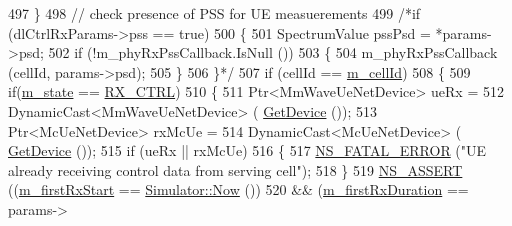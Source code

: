 \begin{DoxyCode}
497                         \}
498                         \textcolor{comment}{// check presence of PSS for UE measuerements}
499                         \textcolor{comment}{/*if (dlCtrlRxParams->pss == true)}
500 \textcolor{comment}{                        \{}
501 \textcolor{comment}{                                SpectrumValue pssPsd = *params->psd;}
502 \textcolor{comment}{                                if (!m\_phyRxPssCallback.IsNull ())}
503 \textcolor{comment}{                                \{}
504 \textcolor{comment}{                                        m\_phyRxPssCallback (cellId, params->psd);}
505 \textcolor{comment}{                                \}}
506 \textcolor{comment}{                        \}*/}
507                         \textcolor{keywordflow}{if} (cellId  == \hyperlink{classns3_1_1MmWaveSpectrumPhy_ac47302ef0f8154064d84adcc0001d77c}{m\_cellId})
508                         \{
509                                 \textcolor{keywordflow}{if}(\hyperlink{classns3_1_1MmWaveSpectrumPhy_ab6330aa9de7700e7e15b82000335665d}{m\_state} == \hyperlink{classns3_1_1MmWaveSpectrumPhy_a665335f60416cf031a9b68209e4368aea1f35c17b447eeb9d376715d1910540fc}{RX\_CTRL})
510                                 \{
511                                         Ptr<MmWaveUeNetDevice> ueRx =
512                                                                         DynamicCast<MmWaveUeNetDevice> (
      \hyperlink{classns3_1_1MmWaveSpectrumPhy_a32b0f96d89e721d518242dcd754a3416}{GetDevice} ());
513                                         Ptr<McUeNetDevice> rxMcUe =
514                                                                         DynamicCast<McUeNetDevice> (
      \hyperlink{classns3_1_1MmWaveSpectrumPhy_a32b0f96d89e721d518242dcd754a3416}{GetDevice} ());                         
515                                         \textcolor{keywordflow}{if} (ueRx || rxMcUe)
516                                         \{
517                                                 \hyperlink{group__fatal_ga5131d5e3f75d7d4cbfd706ac456fdc85}{NS\_FATAL\_ERROR} (\textcolor{stringliteral}{"UE already receiving control
       data from serving cell"});
518                                         \}
519                                         \hyperlink{assert_8h_a6dccdb0de9b252f60088ce281c49d052}{NS\_ASSERT} ((\hyperlink{classns3_1_1MmWaveSpectrumPhy_adf29f10fcd3cc1c10aaec90bcdc80b14}{m\_firstRxStart} == 
      \hyperlink{classns3_1_1Simulator_ac3178fa975b419f7875e7105be122800}{Simulator::Now} ())
520                                                    && (\hyperlink{classns3_1_1MmWaveSpectrumPhy_a626a5e0e4410cf0d8deab2f5c3d40626}{m\_firstRxDuration} == params->

\end{DoxyCode}
